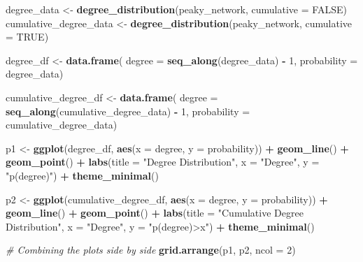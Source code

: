 \documentclass[
]{article}
\newenvironment{Shaded}{\begin{snugshade}}{\end{snugshade}}
\newcommand{\AttributeTok}[1]{\textcolor[rgb]{0.13,0.29,0.53}{#1}}
\newcommand{\CommentTok}[1]{\textcolor[rgb]{0.56,0.35,0.01}{\textit{#1}}}
\newcommand{\ConstantTok}[1]{\textcolor[rgb]{0.56,0.35,0.01}{#1}}
\newcommand{\DecValTok}[1]{\textcolor[rgb]{0.00,0.00,0.81}{#1}}
\newcommand{\FunctionTok}[1]{\textcolor[rgb]{0.13,0.29,0.53}{\textbf{#1}}}
\newcommand{\NormalTok}[1]{#1}
\newcommand{\OtherTok}[1]{\textcolor[rgb]{0.56,0.35,0.01}{#1}}
\newcommand{\SpecialCharTok}[1]{\textcolor[rgb]{0.81,0.36,0.00}{\textbf{#1}}}
\newcommand{\StringTok}[1]{\textcolor[rgb]{0.31,0.60,0.02}{#1}}
\begin{document}
\begin{Shaded}
\begin{Highlighting}[]
\NormalTok{degree\_data }\OtherTok{\textless{}{-}} \FunctionTok{degree\_distribution}\NormalTok{(peaky\_network, }\AttributeTok{cumulative =} \ConstantTok{FALSE}\NormalTok{)}
\NormalTok{cumulative\_degree\_data }\OtherTok{\textless{}{-}} \FunctionTok{degree\_distribution}\NormalTok{(peaky\_network, }\AttributeTok{cumulative =} \ConstantTok{TRUE}\NormalTok{)}

\NormalTok{degree\_df }\OtherTok{\textless{}{-}} \FunctionTok{data.frame}\NormalTok{(}
  \AttributeTok{degree =} \FunctionTok{seq\_along}\NormalTok{(degree\_data) }\SpecialCharTok{{-}} \DecValTok{1}\NormalTok{, }
  \AttributeTok{probability =}\NormalTok{ degree\_data)}

\NormalTok{cumulative\_degree\_df }\OtherTok{\textless{}{-}} \FunctionTok{data.frame}\NormalTok{(}
  \AttributeTok{degree =} \FunctionTok{seq\_along}\NormalTok{(cumulative\_degree\_data) }\SpecialCharTok{{-}} \DecValTok{1}\NormalTok{, }
  \AttributeTok{probability =}\NormalTok{ cumulative\_degree\_data)}

\NormalTok{p1 }\OtherTok{\textless{}{-}} \FunctionTok{ggplot}\NormalTok{(degree\_df, }\FunctionTok{aes}\NormalTok{(}\AttributeTok{x =}\NormalTok{ degree, }\AttributeTok{y =}\NormalTok{ probability)) }\SpecialCharTok{+}
  \FunctionTok{geom\_line}\NormalTok{() }\SpecialCharTok{+}
  \FunctionTok{geom\_point}\NormalTok{() }\SpecialCharTok{+}
  \FunctionTok{labs}\NormalTok{(}\AttributeTok{title =} \StringTok{"Degree Distribution"}\NormalTok{, }\AttributeTok{x =} \StringTok{"Degree"}\NormalTok{, }\AttributeTok{y =} \StringTok{"p(degree)"}\NormalTok{) }\SpecialCharTok{+}
  \FunctionTok{theme\_minimal}\NormalTok{()}

\NormalTok{p2 }\OtherTok{\textless{}{-}} \FunctionTok{ggplot}\NormalTok{(cumulative\_degree\_df, }\FunctionTok{aes}\NormalTok{(}\AttributeTok{x =}\NormalTok{ degree, }\AttributeTok{y =}\NormalTok{ probability)) }\SpecialCharTok{+}
  \FunctionTok{geom\_line}\NormalTok{() }\SpecialCharTok{+}
  \FunctionTok{geom\_point}\NormalTok{() }\SpecialCharTok{+}
  \FunctionTok{labs}\NormalTok{(}\AttributeTok{title =} \StringTok{"Cumulative Degree Distribution"}\NormalTok{, }\AttributeTok{x =} \StringTok{"Degree"}\NormalTok{, }\AttributeTok{y =} \StringTok{"p(degree)\textgreater{}x"}\NormalTok{) }\SpecialCharTok{+}
  \FunctionTok{theme\_minimal}\NormalTok{()}

\CommentTok{\# Combining the plots side by side}
\FunctionTok{grid.arrange}\NormalTok{(p1, p2, }\AttributeTok{ncol =} \DecValTok{2}\NormalTok{)}
\end{Highlighting}
\end{Shaded}
\end{document}
